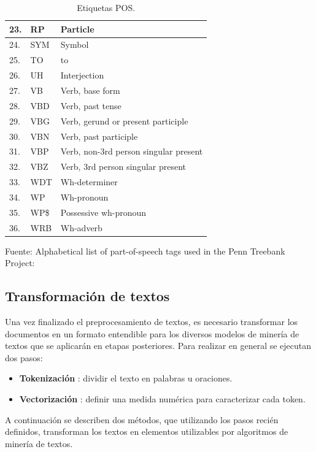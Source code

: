 \begin{table}[h!]
\begin{tabular}{|l|l|l|}
23.    & RP    & Particle                                 \\ \hline
24.    & SYM   & Symbol                                   \\ \hline
25.    & TO    & to                                       \\ \hline
26.    & UH    & Interjection                             \\ \hline
27.    & VB    & Verb, base form                          \\ \hline
28.    & VBD   & Verb, past tense                         \\ \hline
29.    & VBG   & Verb, gerund or present participle       \\ \hline
30.    & VBN   & Verb, past participle                    \\ \hline
31.    & VBP   & Verb, non-3rd person singular present    \\ \hline
32.    & VBZ   & Verb, 3rd person singular present        \\ \hline
33.    & WDT   & Wh-determiner                            \\ \hline
34.    & WP    & Wh-pronoun                               \\ \hline
35.    & WP\$  & Possessive wh-pronoun                    \\ \hline
36.    & WRB   & Wh-adverb                                \\ \hline
\end{tabular}
\caption{\label{table:Etiquetas_POS} Etiquetas POS.} Fuente: Alphabetical list of part-of-speech tags used in the Penn Treebank Project:
\cite{POS_Tag}
\end{table}

\subsection{Transformación de textos}
    Una vez finalizado el preprocesamiento de textos, es necesario transformar los documentos en un formato entendible para los diversos modelos de minería de textos que se aplicarán en etapas posteriores. Para realizar en general se ejecutan dos pasos:
    \begin{itemize}
        \item \textbf{Tokenización} : dividir el texto en palabras u oraciones. 
        \item \textbf{Vectorización} : definir una medida numérica para caracterizar cada token.
    \end{itemize}
    A continuación se describen dos métodos, que utilizando los pasos recién definidos, transforman los textos en elementos utilizables por algoritmos de minería de textos.
